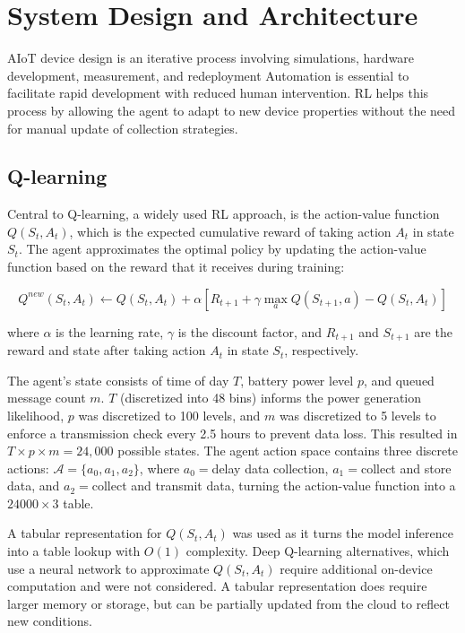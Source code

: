 \documentclass[10pt]{cai}
\begin{document}
\section{System Design and Architecture}

AIoT device design is an iterative process involving simulations, hardware development, measurement, and redeployment
Automation is essential to facilitate rapid development with reduced human intervention.
RL helps this process by allowing the agent to adapt to new device properties without the need for manual update of collection strategies.

\subsection{Q-learning}

Central to Q-learning, a widely used RL approach, is the action-value function $Q(S_t, A_t)$, which is the expected cumulative reward of taking action $A_t$ in state $S_t$.
The agent approximates the optimal policy by updating the action-value function based on the reward that it receives during training\cite{suttonReinforcementLearningIntroduction2020}:

\begin{equation}
Q^{new}(S_t, A_t) \leftarrow Q(S_t, A_t) + \alpha \left[ R_{t+1} + \gamma \max_{a} Q(S_{t+1}, a) - Q(S_t, A_t) \right]
\end{equation}

where $\alpha$ is the learning rate, $\gamma$ is the discount factor, and $R_{t+1}$ and $S_{t+1}$ are the reward and state after taking action $A_t$ in state $S_{t}$, respectively.

The agent's state consists of time of day $T$, battery power level $p$, and queued message count $m$.
$T$ (discretized into 48 bins) informs the power generation likelihood, $p$ was discretized to 100 levels, and $m$ was discretized to 5 levels to enforce a transmission check every 2.5 hours to prevent data loss.
This resulted in $T\times p \times m = 24,000$ possible states. The agent action space contains three discrete actions: $\mathcal{A}=\{a_0, a_1, a_2\}$, where $a_0=$delay data collection, $a_1=$collect and store data, and $a_2=$collect and transmit data, turning the action-value function into a $24000 \times 3$ table.

A tabular representation for $Q(S_t, A_t)$ was used as it turns the model inference into a table lookup with $O(1)$ complexity.
Deep Q-learning alternatives, which use a neural network to approximate $Q(S_t, A_t)$ require additional on-device computation and were not considered.
A tabular representation does require larger memory or storage, but can be partially updated from the cloud to reflect new conditions.
\end{document}
